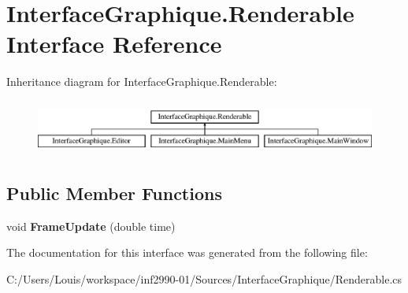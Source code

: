 \hypertarget{interface_interface_graphique_1_1_renderable}{}\section{Interface\+Graphique.\+Renderable Interface Reference}
\label{interface_interface_graphique_1_1_renderable}
Inheritance diagram for Interface\+Graphique.\+Renderable\+:\begin{figure}[H]
\begin{center}
\leavevmode
\includegraphics[height=1.830065cm]{interface_interface_graphique_1_1_renderable}
\end{center}
\end{figure}
\subsection*{Public Member Functions}
\begin{DoxyCompactItemize}
\item 
\hypertarget{interface_interface_graphique_1_1_renderable_a25c30c0df9a336f382132c852fe403b0}{}void {\bfseries Frame\+Update} (double time)\label{interface_interface_graphique_1_1_renderable_a25c30c0df9a336f382132c852fe403b0}

\end{DoxyCompactItemize}


The documentation for this interface was generated from the following file\+:\begin{DoxyCompactItemize}
\item 
C\+:/\+Users/\+Louis/workspace/inf2990-\/01/\+Sources/\+Interface\+Graphique/Renderable.\+cs\end{DoxyCompactItemize}
